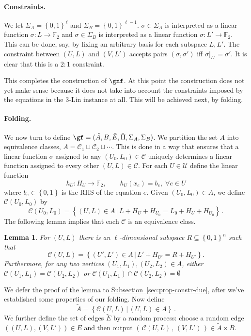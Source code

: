 \documentclass[11pt]{article}
\numberwithin{equation}{section}
\newtheorem{lemma}[theorem]{Lemma}
\theoremstyle{definition}
\theoremstyle{plain}
\newcommand{\C}{\mathbb C}
\newcommand{\expref}[2]{\hyperref[#2]{#1~\ref{#2}}}
\newcommand\set[1]{{\left\{ #1 \right\}}}
\newcommand\power[1]{\set{0,1}^{#1}}
\newcommand\Set[2]{ \left\{ #1 \,  \vert  \, #2\right\} }
\renewcommand\subset{\subseteq}
\def\F{\mathbb{F}}
\def\U{\mathcal{U}}
\def\C{\mathcal{C}}
\begin{document}
\paragraph{Constraints.}
We let $\Sigma_A = \power{\ell}$ and $\Sigma_B = \power{\ell-1}$.
$\sigma\in \Sigma_A$ is interpreted as a linear function $\sigma:L\to\F_2$ and $\sigma\in \Sigma_B$ is interpreted as a linear function $\sigma:L'\to\F_2$.  This can be done, say, by fixing an arbitrary basis for each subspace $L,L'$.
The constraint between $(U,L)$ and $(V,L')$ accepts pairs $(\sigma,\sigma')$ iff  $\sigma|_{L'} = \sigma'$. It is clear that this is a $2:1$ constraint.

This completes the construction of $\gnf$. At this point the construction does not yet make sense because it does not take into account the constraints imposed by the equations in the 3-Lin instance at all. This will be achieved next, by folding.
%
\paragraph{Folding.}
We now turn to define $\gf = (\tilde A,B,\tilde E,\tilde \Pi,\Sigma_A,\Sigma_B)$.
We partition the set $A$ into equivalence classes, $A = \C_1 \sqcup \C_2 \sqcup \cdots$. This is done in a way that ensures that a linear function $\sigma$ assigned to any $(U_0,L_0)\in \C$ uniquely determines a linear function assigned to every other $(U,L)\in \C$. For each $U\in \U$ define the linear function
\begin{equation}\label{eq:hu} h_U:H_U\to\F_2, \qquad h_U(x_e)=b_e, \; \forall e\in U
\end{equation} where $b_e\in\set{0,1}$ is the RHS of the equation $e$.
Given $(U_0,L_0)\in A$, we define $\C(U_0,L_0)$ by
\[
\C(U_0,L_0) = \Set{(U,L)\in A}{ L + H_U + H_{U_0} = L_0 + H_U + H_{U_0}}\,.
\]
The following lemma implies that each $\C$ is an equivalence class.
\begin{lemma}\label{lemma:folding-prop}
For $(U,L)$ there is an $\ell$-dimensional subspace $R \subset \power n$ such that
\[ \C(U,L) = \Set{ (U',L')\in A }{ L'+H_{U'}= R+H_{U'}}.
\]
Furthermore, for any two vertices $(U_1,L_1),(U_2,L_2)\in A$, either $\C(U_1,L_1) = \C(U_2,L_2)$ or $\C(U_1,L_1) \cap \C(U_2,L_2)=\emptyset$
%
 \end{lemma}
%
We defer the proof of the lemma to
\expref{Subsection}{sec:prop-constr-due}, after we've established some
properties of our folding. Now define
\[ \tilde A = \Set{\C(U,L) }{ (U,L)\in A}\,. \]
%
We further define the set of edges $\tilde E$ by a random process: choose a random edge $((U,L),(V,L'))\in E$ and then output $(\,\C(U,L)\,,\,(V,L')\,)\in \tilde A\times B$.
\end{document}

